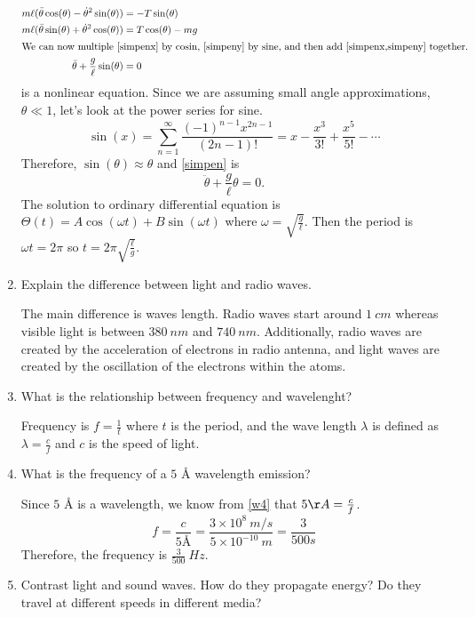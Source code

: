 \begin{enumerate}
  \begin{align}
    m\ell(\ddot{\theta}\cos(\theta) - \dot{\theta}^2\sin(\theta))
    &= -T\sin(\theta)\label{simpenx}\\
    m\ell(\ddot{\theta}\sin(\theta) + \dot{\theta}^2\cos(\theta))
    &= T\cos(\theta) - mg\label{simpeny}\\
    \intertext{We can now multiple \cref{simpenx} by cosin, \cref{simpeny}
    by sine, and then add \cref{simpenx,simpeny} together.}
    \ddot{\theta} + \frac{g}{\ell}\sin(\theta) &= 0\label{simpen}
  \end{align}
   is a nonlinear equation.
  Since we are assuming small angle approximations, \(\theta\ll 1\), let's
  look at the power series for sine.
  \[
  \sin(x) = \sum_{n = 1}^{\infty}\frac{(-1)^{n - 1}x^{2n - 1}}{(2n - 1)!}
  = x - \frac{x^3}{3!} + \frac{x^5}{5!} - \cdots
  \]
  Therefore, \(\sin(\theta)\approx\theta\) and \cref{simpen} is
  \[
  \ddot{\theta} + \frac{g}{\ell}\theta = 0.
  \]
  The solution to ordinary differential equation is
  \(\Theta(t) = A\cos(\omega t) + B\sin(\omega t)\) where
  \(\omega = \sqrt{\frac{g}{\ell}}\).
  Then the period is \(\omega t = 2\pi\) so \(t = 2\pi\sqrt{\frac{\ell}{g}}\).
\item
  Explain the difference between light and radio waves.
  \par\smallskip
  The main difference is waves length.
  Radio waves start around \(1 \ cm\) whereas visible light is between
  \(380 \ nm\) and \(740 \ nm\).
  Additionally, radio waves are created by the acceleration of electrons in
  radio antenna, and light waves are created by the oscillation of the
  electrons within the atoms.
\item
  \label{w4}
  What is the relationship between frequency and wavelenght?
  \par\smallskip
  Frequency is \(f = \frac{1}{t}\) where \(t\) is the period, and the wave
  length \(\lambda\) is defined as \(\lambda = \frac{c}{f}\) and \(c\) is the
  speed of light.
\item
  What is the frequency of a \(5\) \AA{} wavelength emission?
  \par\smallskip
  Since \(5\) \AA{} is a wavelength, we know from \cref{w4} that
  \(5 \AA = \frac{c}{f}\).
  \[
  f = \frac{c}{5\text{\AA}} = \frac{3\times 10^8 \ m/s}{5\times 10^{-10} \ m}
  = \frac{3}{500s}
  \]
  Therefore, the frequency is \(\frac{3}{500} \ Hz\).
\item
  Contrast light and sound waves.
  How do they propagate energy?
  Do they travel at different speeds in different media?

\end{enumerate}

